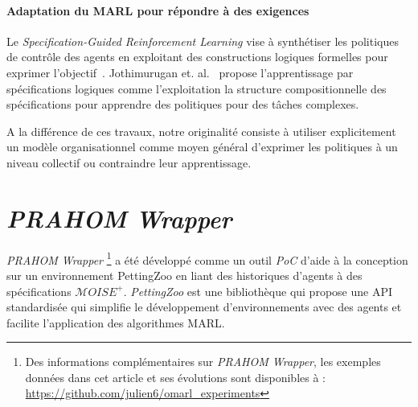 \documentclass[demonstration]{jfsma}
\begin{document}
\paragraph{\textbf{Adaptation du MARL pour répondre à des exigences}}
%
%
Le \emph{Specification-Guided Reinforcement Learning} vise à synthétiser les politiques de contrôle des agents en exploitant des constructions logiques formelles pour exprimer l'objectif~\cite{Bansal2022}.%
%
Jothimurugan et. al.~\cite{Jothimurugan2021} propose l'apprentissage par spécifications logiques comme l'exploitation la structure compositionnelle des spécifications pour apprendre des politiques pour des tâches complexes.

A la différence de ces travaux, notre originalité consiste à utiliser explicitement un modèle organisationnel comme moyen général d'exprimer les politiques à un niveau collectif ou contraindre leur apprentissage. %



\section{\emph{PRAHOM Wrapper}}

\emph{PRAHOM Wrapper}\label{PettingZoo-wrapper}
\footnote{Des informations complémentaires sur \emph{PRAHOM Wrapper}, les exemples données dans cet article et ses évolutions sont disponibles à : \url{https://github.com/julien6/omarl_experiments}}
a été développé comme un outil \emph{PoC} d'aide à la conception sur un environnement PettingZoo en liant des historiques d'agents à des spécifications $\mathcal{M}OISE^+$. \emph{PettingZoo} est une bibliothèque qui propose une API standardisée qui simplifie le développement d'environnements avec des agents et facilite l'application des algorithmes MARL.
\end{document}
